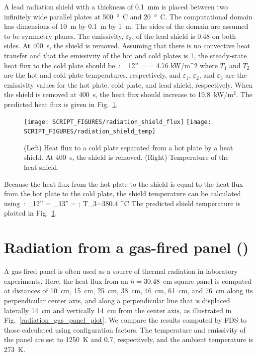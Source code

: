 \documentclass[11pt]{book}
\begin{document}
A lead radiation shield with a thickness of 0.1~mm is placed between two infinitely wide parallel plates at 500~\si{\degree C} and 20~\si{\degree C}.  The computational domain has dimensions of 10~m by 0.1~m by 1~m. The sides of the domain are assumed to be symmetry planes.  The emissivity, $\varepsilon_{3}$, of the lead shield is 0.48 on both sides.  At 400~s, the shield is removed.  Assuming that there is no convective heat transfer and that the emissivity of the hot and cold plates is 1, the steady-state heat flux to the cold plate should be~\cite{Incropera:1}:
\be
   \dq_{12}'' =  = 4.76 \; \hbox{kW/m}^2
\ee
where $T_{1}$ and $T_{2}$ are the hot and cold plate temperatures, respectively, and $\varepsilon_1$, $\varepsilon_2$, and $\varepsilon_3$ are the emissivity values for the hot plate, cold plate, and lead shield, respectively. When the shield is removed at 400~s, the heat flux should increase to 19.8~kW/m$^2$.  The predicted heat flux is given in Fig.~\ref{radiation_shield_plot}.
\begin{figure}[ht]
\texttt{[image: SCRIPT\_FIGURES/radiation\_shield\_flux]}
\texttt{[image: SCRIPT\_FIGURES/radiation\_shield\_temp]}
\caption[The  test case]{(Left) Heat flux to a cold plate separated from a hot plate by a heat shield. At 400~s, the shield is removed. (Right) Temperature of the heat shield.}
\label{radiation_shield_plot}
\end{figure}
Because the heat flux from the hot plate to the shield is equal to the heat flux from the hot plate to the cold plate, the shield temperature can be calculated using~\cite{Incropera:1}:
\be
   \dq_{12}'' = \dq_{13}'' =  \quad ; \quad T_3=380.4 \; ^\circ\hbox{C}
\ee
The predicted shield temperature is plotted in Fig.~\ref{radiation_shield_plot}.


\section{Radiation from a gas-fired panel (\texorpdfstring{}{radiation\_gas\_panel}) }
\label{radiation_gas_panel}

A gas-fired panel is often used as a source of thermal radiation in laboratory experiments.  Here, the heat flux from an $h=30.48$~cm square panel is computed at distances of 10~cm, 15~cm, 25~cm, 38~cm, 46~cm, 61~cm, and 76~cm along its perpendicular center axis, and along a perpendicular line that is displaced laterally 14~cm and vertically 14~cm from the center axis, as illustrated in Fig.~\ref{radiation_gas_panel_plot}.  We compare the results computed by FDS to those calculated using configuration factors. The temperature and emissivity of the panel are set to 1250~K and 0.7, respectively, and the ambient temperature is 273~K.
\end{document}
